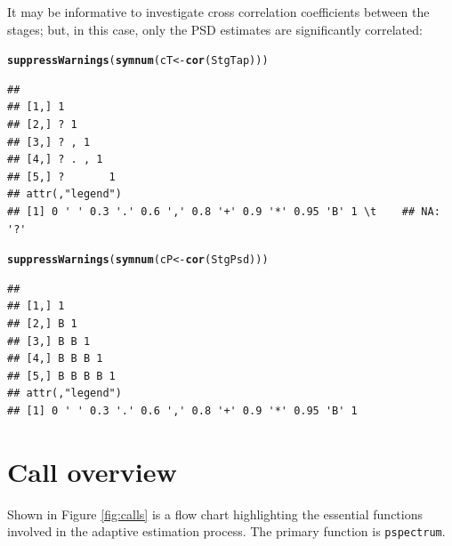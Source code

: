 \documentclass[10pt]{article}\usepackage[]{graphicx}\usepackage[]{color}
\makeatletter
\newcommand{\hlstd}[1]{\textcolor[rgb]{0.345,0.345,0.345}{#1}}%
\newcommand{\hlkwb}[1]{\textcolor[rgb]{0.69,0.353,0.396}{#1}}%
\newcommand{\hlkwd}[1]{\textcolor[rgb]{0.737,0.353,0.396}{\textbf{#1}}}%
\newenvironment{kframe}{%
 \def\at@end@of@kframe{}%
 \ifinner\ifhmode%
  \def\at@end@of@kframe{\end{minipage}}%
  \begin{minipage}{\columnwidth}%
 \fi\fi%
 \def\FrameCommand##1{\hskip\@totalleftmargin \hskip-\fboxsep
 \colorbox{shadecolor}{##1}\hskip-\fboxsep
     \hskip-\linewidth \hskip-\@totalleftmargin \hskip\columnwidth}%
 \MakeFramed {\advance\hsize-\width
   \@totalleftmargin\z@ \linewidth\hsize
   \@setminipage}}%
 {\par\unskip\endMakeFramed%
 \at@end@of@kframe}
\newenvironment{knitrout}{}{} %
\newcommand{\Rcmd}[1]{\texttt{#1}}
\makeatother
\begin{document}
It may be informative to investigate cross correlation
coefficients between the stages;
but, in this case, only the PSD estimates are significantly correlated:
\begin{knitrout}\small
{}\color{fgcolor}\begin{kframe}
\begin{alltt}
\hlkwd{suppressWarnings}\hlstd{(}\hlkwd{symnum}\hlstd{(cT} \hlkwb{<-} \hlkwd{cor}\hlstd{(StgTap)))}
\end{alltt}
\begin{verbatim}
##               
## [1,] 1        
## [2,] ? 1      
## [3,] ? , 1    
## [4,] ? . , 1  
## [5,] ?       1
## attr(,"legend")
## [1] 0 ' ' 0.3 '.' 0.6 ',' 0.8 '+' 0.9 '*' 0.95 'B' 1 \t    ## NA: '?'
\end{verbatim}
\end{kframe}
\end{knitrout}
\begin{knitrout}\small
{}\color{fgcolor}\begin{kframe}
\begin{alltt}
\hlkwd{suppressWarnings}\hlstd{(}\hlkwd{symnum}\hlstd{(cP} \hlkwb{<-} \hlkwd{cor}\hlstd{(StgPsd)))}
\end{alltt}
\begin{verbatim}
##               
## [1,] 1        
## [2,] B 1      
## [3,] B B 1    
## [4,] B B B 1  
## [5,] B B B B 1
## attr(,"legend")
## [1] 0 ' ' 0.3 '.' 0.6 ',' 0.8 '+' 0.9 '*' 0.95 'B' 1
\end{verbatim}
\end{kframe}
\end{knitrout}


\section{Call overview}

Shown
in Figure \ref{fig:calls}
is a flow chart 
highlighting the essential
functions involved in the adaptive estimation
process. The primary function is \Rcmd{pspectrum}.
\end{document}
